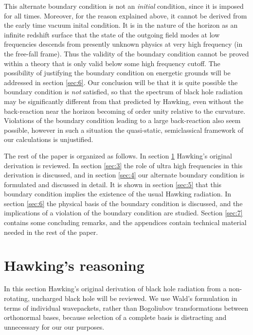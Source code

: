 This alternate boundary condition is not an {\it initial}
condition, since it is imposed for all times. Moreover, for
the reason explained above, it cannot be derived from the
early time vacuum inital condition. It is in the nature of the
horizon as an infinite redshift surface that the state of
the outgoing field modes at low frequencies descends from
presently unknown physics at very high frequency (in the
free-fall frame). Thus the validity of
the boundary condition cannot be proved within a theory that
is only valid below some high frequency cutoff.
The possibility of justifying the boundary condition on
energetic grounds will be addressed in section \ref{sec:6}.
Our conclusion will be that it is quite possible the
boundary condition is {\it not} satisfied, so that the
spectrum of black hole radiation may be significantly
different from that predicted by Hawking, even without the
back-reaction near the horizon becoming of order unity relative
to the curvature. Violations of the boundary condition leading
to a large back-reaction also seem possible, however in such
a situation the quasi-static, semiclassical framework of
our calculations is unjustified.

The rest of the paper is organized as follows. In section
\ref{sec:2}
Hawking's original derivation is reviewed. In section
\ref{sec:3} the
role of ultra high frequencies in this derivation is
discussed, and in section \ref{sec:4}
our alternate boundary condition
is formulated and discussed in detail. It is shown in
section \ref{sec:5}
that this boundary condition implies the existence
of the usual Hawking radiation. In section \ref{sec:6} the
physical basis of the boundary condition is discussed, and the
implications of a violation of the boundary condition are studied.
Section \ref{sec:7} contains some concluding remarks, and
the appendices contain technical material needed in
the rest of the paper.

\section{Hawking's reasoning}
\label{sec:2}

In this section Hawking's original derivation \cite{Hawk75}
of black hole  radiation from a non-rotating, uncharged
black hole will be reviewed. We use Wald's formulation
\cite{Wald75} in terms  of individual wavepackets, rather
than Bogoliubov transformations between orthonormal bases,
because selection of a complete basis is distracting and
unnecessary for our our purposes.

